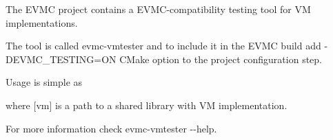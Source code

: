 \label{vmtester_md_docs_VM_Tester}%
%
 The EVMC project contains a EVMC-\/compatibility testing tool for VM implementations.

The tool is called {\ttfamily evmc-\/vmtester} and to include it in the EVMC build add {\ttfamily -\/DEVMC\+\_\+\+TESTING=ON} CMake option to the project configuration step.

Usage is simple as


\begin{DoxyCode}{0}

\end{DoxyCode}


where {\ttfamily \mbox{[}vm\mbox{]}} is a path to a shared library with VM implementation.

For more information check {\ttfamily evmc-\/vmtester -\/-\/help}. 